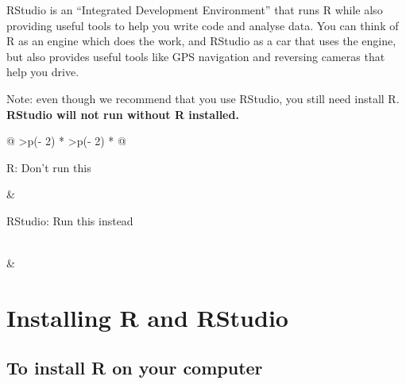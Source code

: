 \documentclass[
]{memoir}
\begin{document}
RStudio is an ``Integrated Development Environment'' that runs R while also providing useful tools to help you write code and analyse data. You can think of R as an engine which does the work, and RStudio as a car that uses the engine, but also provides useful tools like GPS navigation and reversing cameras that help you drive.

Note: even though we recommend that you use RStudio, you still need install R. \textbf{RStudio will not run without R installed.}

\begin{longtable}[]{@{}
  >{\centering\arraybackslash}p{(\columnwidth - 2\tabcolsep) * }
  >{\centering\arraybackslash}p{(\columnwidth - 2\tabcolsep) * }@{}}
\toprule
\begin{minipage}[b]{\linewidth}\centering
R: Don't run this
\end{minipage} & \begin{minipage}[b]{\linewidth}\centering
RStudio: Run this instead
\end{minipage} \\
\midrule
\endhead
& \\
\bottomrule
\end{longtable}

\hypertarget{installing-r-and-rstudio}{%
\section{Installing R and RStudio}\label{installing-r-and-rstudio}}

\hypertarget{to-install-r-on-your-computer}{%
\subsection{To install R on your computer}\label{to-install-r-on-your-computer}}
\end{document}
